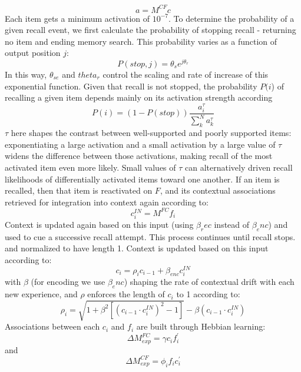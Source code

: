 {}$$a = M^{CF}c$$\markdownRendererInterblockSeparator
{}Each item gets a minimum activation of $10^{-7}$. To determine the probability of a given recall event, we first calculate the probability of stopping recall - returning no item and ending memory search. This probability varies as a function of output position $j$:\markdownRendererInterblockSeparator
{}$$P(stop, j) = \theta_se^{j\theta_r}$$\markdownRendererInterblockSeparator
{}In this way, $\theta_{se}$ and $theta_r$ control the scaling and rate of increase of this exponential function. Given that recall is not stopped, the probability $P(i$) of recalling a given item depends mainly on its activation strength according\markdownRendererInterblockSeparator
{}$$P(i) = (1-P(stop))\frac{a^{\tau}_i}{\sum_{k}^{N}a^{\tau}_k}$$\markdownRendererInterblockSeparator
{}$\tau$ here shapes the contrast between well-supported and poorly supported items: exponentiating a large activation and a small activation by a large value of $\tau$ widens the difference between those activations, making recall of the most activated item even more likely. Small values of $\tau$ can alternatively driven recall likelihoods of differentially activated items toward one another.\markdownRendererInterblockSeparator
{}If an item is recalled, then that item is reactivated on $F$, and its contextual associations retrieved for integration into context again according to:\markdownRendererInterblockSeparator
{}$$c^{IN}_{i} = M^{FC}f_{i}$$\markdownRendererInterblockSeparator
{}Context is updated again based on this input (using $\beta_rec$ instead of $\beta_enc$) and used to cue a successive recall attempt. This process continues until recall stops.\markdownRendererInterblockSeparator
{}and normalized to have length 1. Context is updated based on this input according to:\markdownRendererInterblockSeparator
{}$$c_i = \rho_ic_{i-1} + \beta_{enc} c_{i}^{IN}$$\markdownRendererInterblockSeparator
{}with $\beta$ (for encoding we use $\beta_enc$) shaping the rate of contextual drift with each new experience, and $\rho$ enforces the length of $c_i$ to 1 according to:\markdownRendererInterblockSeparator
{}$$\rho_i = \sqrt{1 + \beta^2\left[\left(c_{i-1} \cdot c^{IN}_i\right)^2 - 1\right]} - \beta\left(c_{i-1} \cdot c^{IN}_i\right)$$\markdownRendererInterblockSeparator
{}Associations between each $c_i$ and $f_i$ are built through Hebbian learning:\markdownRendererInterblockSeparator
{}$$\Delta M^{FC}_{exp} = \gamma c_i f^{'}_i$$\markdownRendererInterblockSeparator
{}and\markdownRendererInterblockSeparator
{}$$\Delta M^{CF}_{exp} = \phi_i f_i c^{'}_i$$\markdownRendererInterblockSeparator
